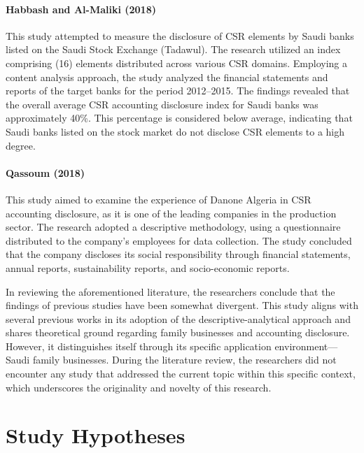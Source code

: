 \documentclass[10pt]{NSP1}
\begin{document}
	\paragraph{Habbash and Al-Maliki (2018) \cite{Habbash2018}} This study attempted to measure the disclosure of CSR elements by Saudi banks listed on the Saudi Stock Exchange (Tadawul). The research utilized an index comprising (16) elements distributed across various CSR domains. Employing a content analysis approach, the study analyzed the financial statements and reports of the target banks for the period 2012–2015. The findings revealed that the overall average CSR accounting disclosure index for Saudi banks was approximately 40\%. This percentage is considered below average, indicating that Saudi banks listed on the stock market do not disclose CSR elements to a high degree.
	
	\paragraph{Qassoum (2018) \cite{Qassoum2018}} This study aimed to examine the experience of Danone Algeria in CSR accounting disclosure, as it is one of the leading companies in the production sector. The research adopted a descriptive methodology, using a questionnaire distributed to the company's employees for data collection. The study concluded that the company discloses its social responsibility through financial statements, annual reports, sustainability reports, and socio-economic reports.
	
	In reviewing the aforementioned literature, the researchers conclude that the findings of previous studies have been somewhat divergent. This study aligns with several previous works in its adoption of the descriptive-analytical approach and shares theoretical ground regarding family businesses and accounting disclosure. However, it distinguishes itself through its specific application environment—Saudi family businesses. During the literature review, the researchers did not encounter any study that addressed the current topic within this specific context, which underscores the originality and novelty of this research.
	
	\section{Study Hypotheses}
	
\end{document}
